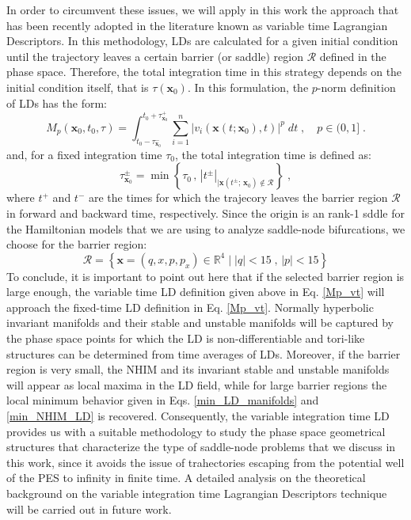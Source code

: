 \documentclass{ws-ijbc}
\begin{document}
In order to circumvent these issues, we will apply in this work the approach that has been recently adopted in the literature \cite{junginger2017chemical,Naik2019b} known as variable time Lagrangian Descriptors. In this methodology, LDs are calculated for a given initial condition until the trajectory leaves a certain barrier (or saddle) region $\mathcal{R}$ defined in the phase space. Therefore, the total integration time in this strategy depends on the initial condition itself, that is $\tau(\mathbf{x}_0)$. In this formulation, the $p$-norm definition of LDs has the form:
\begin{equation}
M_p(\mathbf{x}_{0},t_0,\tau) = \int^{t_0 + \tau^{+}_{\mathbf{x}_0}}_{t_0 - \tau^{-}_{\mathbf{x}_0}} \sum_{i=1}^{n} |v_{i}(\mathbf{x}(t;\mathbf{x}_0),t)|^p \; dt \;,\quad p \in (0,1] \;.
\label{Mp_vt}
\end{equation}
and, for a fixed integration time $\tau_0$, the total integration time is defined as:
\begin{equation}
\tau^{\pm}_{\mathbf{x}_{0}} = \min \left\lbrace \tau_0 \, , \, |t^{\pm}|_{\big| \mathbf{x}\left(t^{\pm}; \, \mathbf{x}_{0}\right) \notin \mathcal{R}} \right\rbrace \; ,
\end{equation}
where $t^{+}$ and $t^{-}$ are the times for which the trajecory leaves the barrier region $\mathcal{R}$ in forward and backward time, respectively. Since the origin is an rank-1 sddle for the Hamiltonian models that we are using to analyze saddle-node bifurcations, we choose for the barrier region:
\begin{equation}
\mathcal{R} = \left\lbrace \mathbf{x} = (q,x,p,p_x) \in \mathbb{R}^4 \; \big| \; |q| < 15 \; , \, |p| < 15 \right\rbrace
\end{equation}
To conclude, it is important to point out here that if the selected barrier region is large enough, the variable time LD definition given above in Eq. \eqref{Mp_vt} will approach the fixed-time LD definition in Eq. \eqref{Mp_vt}. Normally hyperbolic invariant manifolds and their stable and unstable manifolds will be captured by the phase space points for which the LD is non-differentiable and tori-like structures can be determined from time averages of LDs. Moreover, if the barrier region is very small, the NHIM and its invariant stable and unstable manifolds will appear as local maxima in the LD field, while for large barrier regions the local minimum behavior given in Eqs. \eqref{min_LD_manifolds} and \eqref{min_NHIM_LD} is recovered. Consequently, the variable integration time LD provides us with a suitable methodology to study the phase space geometrical structures that characterize the type of saddle-node problems that we discuss in this work, since it avoids the issue of trahectories escaping from the potential well of the PES to infinity in finite time. A detailed analysis on the theoretical background on the variable integration time Lagrangian Descriptors technique will be carried out in future work.
\end{document}
